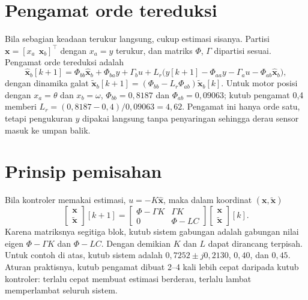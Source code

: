 \section{Pengamat orde tereduksi}
Bila sebagian keadaan terukur langsung, cukup estimasi sisanya. Partisi $\mathbf{x} = [x_a\ \ \mathbf{x}_b]^\top$ dengan $x_a = y$ terukur, dan matriks $\Phi$, $\Gamma$ dipartisi sesuai. Pengamat orde tereduksi adalah
\begin{equation}
	\hat{\mathbf{x}}_b[k+1] = \Phi_{bb}\hat{\mathbf{x}}_b + \Phi_{ba}y + \Gamma_bu + L_r\big(y[k+1] - \Phi_{aa}y - \Gamma_au - \Phi_{ab}\hat{\mathbf{x}}_b\big),
\end{equation}
dengan dinamika galat $\tilde{\mathbf{x}}_b[k+1] = (\Phi_{bb} - L_r\Phi_{ab})\tilde{\mathbf{x}}_b[k]$. Untuk motor posisi dengan $x_a = \theta$ dan $x_b = \omega$, $\Phi_{bb} = 0{,}8187$ dan $\Phi_{ab} = 0{,}09063$; kutub pengamat 0,4 memberi $L_r = (0{,}8187 - 0{,}4)/0{,}09063 = 4{,}62$. Pengamat ini hanya orde satu, tetapi pengukuran $y$ dipakai langsung tanpa penyaringan sehingga derau sensor masuk ke umpan balik.

\section{Prinsip pemisahan}
Bila kontroler memakai estimasi, $u = -K\hat{\mathbf{x}}$, maka dalam koordinat $(\mathbf{x}, \tilde{\mathbf{x}})$
\begin{equation}
	\begin{bmatrix}\mathbf{x}\\ \tilde{\mathbf{x}}\end{bmatrix}[k+1] = \begin{bmatrix}\Phi - \Gamma K & \Gamma K\\ 0 & \Phi - LC\end{bmatrix}\begin{bmatrix}\mathbf{x}\\ \tilde{\mathbf{x}}\end{bmatrix}[k].
\end{equation}
Karena matriksnya segitiga blok, kutub sistem gabungan adalah gabungan nilai eigen $\Phi - \Gamma K$ dan $\Phi - LC$. Dengan demikian $K$ dan $L$ dapat dirancang terpisah. Untuk contoh di atas, kutub sistem adalah $0{,}7252 \pm j0{,}2130$, $0{,}40$, dan $0{,}45$. Aturan praktisnya, kutub pengamat dibuat 2--4 kali lebih cepat daripada kutub kontroler: terlalu cepat membuat estimasi berderau, terlalu lambat memperlambat seluruh sistem.

